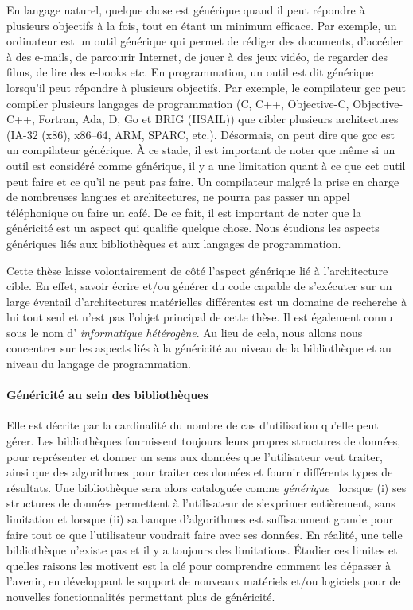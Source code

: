 En langage naturel, quelque chose est générique quand il peut répondre à plusieurs objectifs à la fois, tout en étant un
minimum efficace. Par exemple, un ordinateur est un outil générique qui permet de rédiger des documents, d'accéder à des
e-mails, de parcourir Internet, de jouer à des jeux vidéo, de regarder des films, de lire des e-books etc. En
programmation, un outil est dit générique lorsqu'il peut répondre à plusieurs objectifs. Par exemple, le compilateur gcc
peut compiler plusieurs langages de programmation (C, C++, Objective-C, Objective-C++, Fortran, Ada, D, Go et BRIG
(HSAIL)) que cibler plusieurs architectures (IA-32 (x86), x86--64, ARM, SPARC, etc.). Désormais, on peut dire que gcc
est un compilateur générique. À ce stade, il est important de noter que même si un outil est considéré comme générique,
il y a une limitation quant à ce que cet outil peut faire et ce qu'il ne peut pas faire. Un compilateur malgré la prise
en charge de nombreuses langues et architectures, ne pourra pas passer un appel téléphonique ou faire un café. De ce
fait, il est important de noter que la généricité est un aspect qui qualifie quelque chose. Nous étudions les aspects
génériques liés aux bibliothèques et aux langages de programmation.

Cette thèse laisse volontairement de côté l'aspect générique lié à l'architecture cible. En effet, savoir écrire et/ou
générer du code capable de s'exécuter sur un large éventail d'architectures matérielles différentes est un domaine de
recherche à lui tout seul et n'est pas l'objet principal de cette thèse. Il est également connu sous le nom d'
\emph{informatique hétérogène}. Au lieu de cela, nous allons nous concentrer sur les aspects liés à la généricité au
niveau de la bibliothèque et au niveau du langage de programmation.

\paragraph{Généricité au sein des bibliothèques} Elle est décrite par la cardinalité du nombre de cas d'utilisation
qu'elle peut gérer. Les bibliothèques fournissent toujours leurs propres structures de données, pour représenter et
donner un sens aux données que l'utilisateur veut traiter, ainsi que des algorithmes pour traiter ces données et fournir
différents types de résultats. Une bibliothèque sera alors cataloguée comme
\emph{générique}~\parencite{musser.1994.algorithm} lorsque (i) ses structures de données permettent à l'utilisateur de
s'exprimer entièrement, sans limitation et lorsque (ii) sa banque d'algorithmes est suffisamment grande pour faire tout
ce que l'utilisateur voudrait faire avec ses données. En réalité, une telle bibliothèque n'existe pas et il y a toujours
des limitations. Étudier ces limites et quelles raisons les motivent est la clé pour comprendre comment les dépasser à
l'avenir, en développant le support de nouveaux matériels et/ou logiciels pour de nouvelles fonctionnalités permettant
plus de généricité.

